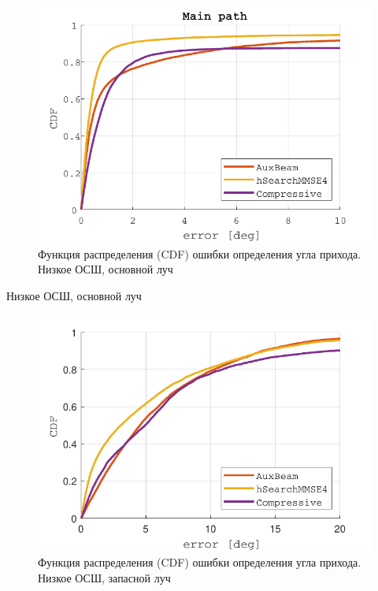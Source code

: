 \begin{figure}[H]
  \centering
  \includegraphics{results/rus/multipath-static-LOW-SNR-1}
  \caption{Функция распределения (CDF) ошибки определения угла прихода. Низкое ОСШ, основной луч}
  \label{fig:multipath:static:LOW-SNR:1}
\end{figure}

\begin{table}[H]
  \begin{center}
    \caption{Низкое ОСШ, основной луч}
    \label{tab:multipath:static:LOW-SNR:1}
  \end{center}
\end{table}

\begin{figure}[H]
  \centering
  \includegraphics{results/rus/multipath-static-LOW-SNR-2}
  \caption{Функция распределения (CDF) ошибки определения угла прихода. Низкое ОСШ, запасной луч}
  \label{fig:multipath:static:LOW-SNR:2}
\end{figure}

